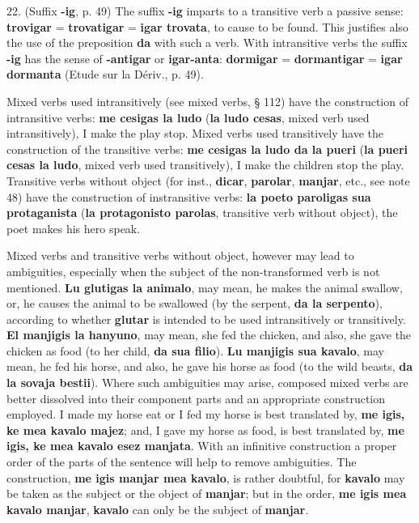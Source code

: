 22. (Suffix \textbf{-ig}, p. 49) The suffix \textbf{-ig} imparts to a transitive verb a passive sense: \textbf{trovigar} = \textbf{trovatigar} = \textbf{igar trovata}, to cause to be found. This justifies also the use of the preposition \textbf{da} with such a verb. With intransitive verbs the suffix \textbf{-ig} has the sense of \textbf{-antigar} or \textbf{igar-anta}: \textbf{dormigar} = \textbf{dormantigar} = \textbf{igar dormanta} (Etude sur la Dériv., p. 49). %

Mixed verbs used intransitively (see mixed verbs, § 112) have the construction of intransitive verbs:\textbf{ me cesigas la ludo} (\textbf{la ludo cesas}, mixed verb used intransitively), I make the play stop. Mixed verbs used transitively have the construction of the transitive verbs: \textbf{me cesigas la ludo da la pueri} (\textbf{la pueri cesas la ludo}, mixed verb used transitively), I make the children stop the play. Transitive verbs without object (for inst., \textbf{dicar}, \textbf{parolar}, \textbf{manjar}, etc., see note 48) have the construction of instransitive verbs: \textbf{la poeto paroligas sua protaganista} (\textbf{la protagonisto parolas}, transitive verb without object), the poet makes his hero speak.

Mixed verbs and transitive verbs without object, however may lead to ambiguities, especially when the subject of the non-transformed verb is not mentioned. \textbf{Lu glutigas la animalo}, may mean, he makes the animal swallow, or, he causes the animal to be swallowed (by the serpent, \textbf{da la serpento}), according to whether \textbf{glutar} is intended to be used intransitively or transitively. \textbf{El manjigis la hanyuno}, may mean, she fed the chicken, and also, she gave the chicken as food (to her child, \textbf{da sua filio}). \textbf{Lu manjigis sua kavalo}, may mean, he fed his horse, and also, he gave his horse as food (to the wild beasts, \textbf{da la sovaja bestii}). Where such ambiguities may arise, composed mixed verbs are better dissolved into their component parts and an appropriate construction employed. I made my horse eat or I fed my horse is best translated by, \textbf{me igis, ke mea kavalo majez}; and, I gave my horse as food, is best translated by, \textbf{me igis, ke mea kavalo esez manjata}. With an infinitive construction a proper order of the parts of the sentence will help to remove ambiguities. The construction, \textbf{me igis manjar mea kavalo}, is rather doubtful, for \textbf{kavalo} may be taken as the subject or the object of \textbf{manjar}; but in the order, \textbf{me igis mea kavalo manjar}, \textbf{kavalo} can only be the subject of \textbf{manjar}.


